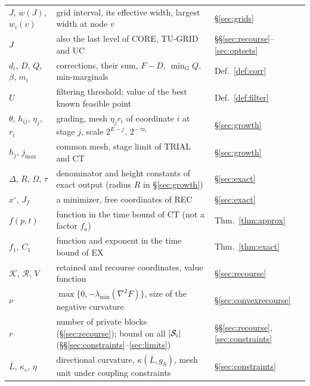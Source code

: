 \begin{table}[htbp]
\begin{tabular}{@{}lll@{}}
$J$, $w(J)$, $w_i(v)$ & grid interval, its effective width, largest width at node $v$ & \S\ref{sec:grids}\\
$J$ & also the last level of CORE, TU-GRID and UC & \S\S\ref{sec:recourse}--\ref{sec:optsets}\\
$d_i$, $D$, $Q$, $\beta$, $m_i$ & corrections, their sum, $F-D$, $\min_GQ$, min-marginals & Def.~\ref{def:corr}\\
$U$ & filtering threshold; value of the best known feasible point & Def.~\ref{def:filter}\\
$\theta$, $h_{ij}$, $\eta_j$, $r_i$ & grading, mesh $\eta_jr_i$ of coordinate $i$ at stage $j$, scale $2^{E-j}$, $2^{-\varpi_i}$ & \S\ref{sec:growth}\\
$h_j$, $j_{\max}$ & common mesh, stage limit of TRIAL and CT & \S\ref{sec:growth}\\
$\Delta$, $R$, $\Omega$, $\tau$ & denominator and height constants of exact output (radius $R$ in \S\ref{sec:growth}) & \S\ref{sec:exact}\\
$x^\circ$, $J_f$ & a minimizer, free coordinates of REC & \S\ref{sec:exact}\\
$f(p,t)$ & function in the time bound of CT (not a factor $f_a$) & Thm.~\ref{thm:approx}\\
$f_1$, $C_1$ & function and exponent in the time bound of EX & Thm.~\ref{thm:exact}\\
$\mathcal K$, $\mathcal R$, $V$ & retained and recourse coordinates, value function & \S\ref{sec:recourse}\\
$\nu$ & $\max\{0,-\lambda_{\min}(\nabla^2F)\}$, size of the negative curvature & \S\ref{sec:convexrecourse}\\
$r$ & number of private blocks (\S\ref{sec:recourse}); bound on all $\lvert \mathcal S_i\rvert$ (\S\S\ref{sec:constraints}--\ref{sec:limits}) & \S\S\ref{sec:recourse}, \ref{sec:constraints}\\
$\bar L$, $\kappa_c$, $\eta$ & directional curvature, $\kappa(\bar L,g_S)$, mesh unit under coupling constraints & \S\ref{sec:constraints}\\
\bottomrule
\end{tabular}
\end{table}
